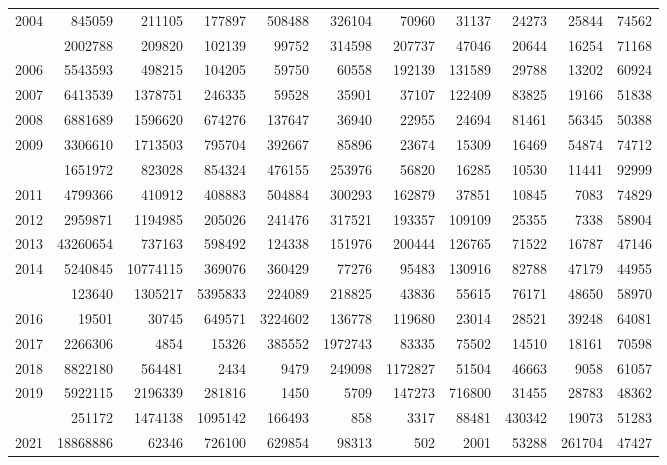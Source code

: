\documentclass[
]{article}
\begin{document}
\begin{longtable}[t]{lrrrrrrrrrr}
2004 & 845059 & 211105 & 177897 & 508488 & 326104 & 70960 & 31137 & 24273 & 25844 & 74562\\
\addlinespace
2005 & 2002788 & 209820 & 102139 & 99752 & 314598 & 207737 & 47046 & 20644 & 16254 & 71168\\
2006 & 5543593 & 498215 & 104205 & 59750 & 60558 & 192139 & 131589 & 29788 & 13202 & 60924\\
2007 & 6413539 & 1378751 & 246335 & 59528 & 35901 & 37107 & 122409 & 83825 & 19166 & 51838\\
2008 & 6881689 & 1596620 & 674276 & 137647 & 36940 & 22955 & 24694 & 81461 & 56345 & 50388\\
2009 & 3306610 & 1713503 & 795704 & 392667 & 85896 & 23674 & 15309 & 16469 & 54874 & 74712\\
\addlinespace
2010 & 1651972 & 823028 & 854324 & 476155 & 253976 & 56820 & 16285 & 10530 & 11441 & 92999\\
2011 & 4799366 & 410912 & 408883 & 504884 & 300293 & 162879 & 37851 & 10845 & 7083 & 74829\\
2012 & 2959871 & 1194985 & 205026 & 241476 & 317521 & 193357 & 109109 & 25355 & 7338 & 58904\\
2013 & 43260654 & 737163 & 598492 & 124338 & 151976 & 200444 & 126765 & 71522 & 16787 & 47146\\
2014 & 5240845 & 10774115 & 369076 & 360429 & 77276 & 95483 & 130916 & 82788 & 47179 & 44955\\
\addlinespace
2015 & 123640 & 1305217 & 5395833 & 224089 & 218825 & 43836 & 55615 & 76171 & 48650 & 58970\\
2016 & 19501 & 30745 & 649571 & 3224602 & 136778 & 119680 & 23014 & 28521 & 39248 & 64081\\
2017 & 2266306 & 4854 & 15326 & 385552 & 1972743 & 83335 & 75502 & 14510 & 18161 & 70598\\
2018 & 8822180 & 564481 & 2434 & 9479 & 249098 & 1172827 & 51504 & 46663 & 9058 & 61057\\
2019 & 5922115 & 2196339 & 281816 & 1450 & 5709 & 147273 & 716800 & 31455 & 28783 & 48362\\
\addlinespace
2020 & 251172 & 1474138 & 1095142 & 166493 & 858 & 3317 & 88481 & 430342 & 19073 & 51283\\
2021 & 18868886 & 62346 & 726100 & 629854 & 98313 & 502 & 2001 & 53288 & 261704 & 47427\\*
\end{longtable}
\end{document}
